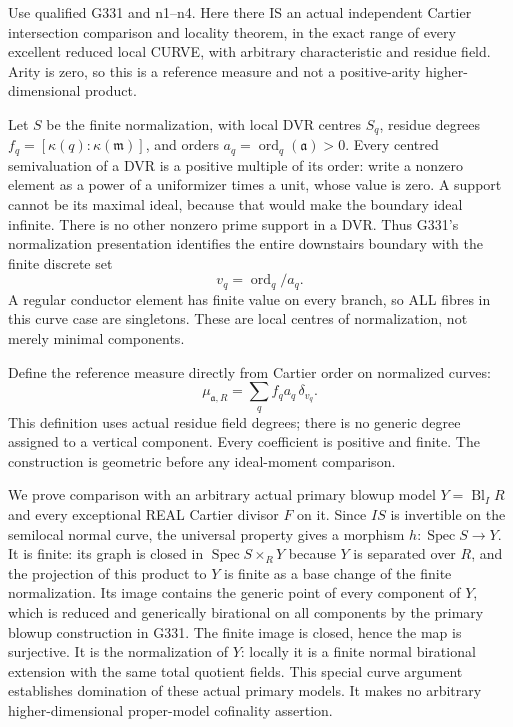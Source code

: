 \documentclass[
  11pt,
]{article}
\begin{document}
Use qualified G331 and n1--n4. Here there IS an actual independent
Cartier intersection comparison and locality theorem, in the exact range
of every excellent reduced local CURVE, with arbitrary characteristic
and residue field. Arity is zero, so this is a reference measure and not
a positive-arity higher-dimensional product.

Let \(S\) be the finite normalization, with local DVR centres \(S_q\),
residue degrees \(f_q=[\kappa(q):\kappa(\mathfrak m)]\), and orders
\(a_q=\operatorname{ord}_q(\mathfrak a)>0\). Every centred semivaluation
of a DVR is a positive multiple of its order: write a nonzero element as
a power of a uniformizer times a unit, whose value is zero. A support
cannot be its maximal ideal, because that would make the boundary ideal
infinite. There is no other nonzero prime support in a DVR. Thus G331's
normalization presentation identifies the entire downstairs boundary
with the finite discrete set \[v_q=\operatorname{ord}_q/a_q.\] A regular
conductor element has finite value on every branch, so ALL fibres in
this curve case are singletons. These are local centres of
normalization, not merely minimal components.

Define the reference measure directly from Cartier order on normalized
curves: \[\mu_{\mathfrak a,R}=\sum_q f_q a_q\,\delta_{v_q}.\tag{5}\]
This definition uses actual residue field degrees; there is no generic
degree assigned to a vertical component. Every coefficient is positive
and finite. The construction is geometric before any ideal-moment
comparison.

We prove comparison with an arbitrary actual primary blowup model
\(Y=\operatorname{Bl}_I R\) and every exceptional REAL Cartier divisor
\(F\) on it. Since \(I S\) is invertible on the semilocal normal curve,
the universal property gives a morphism \(h:\operatorname{Spec}S\to Y\).
It is finite: its graph is closed in \(\operatorname{Spec}S\times_R Y\)
because \(Y\) is separated over \(R\), and the projection of this
product to \(Y\) is finite as a base change of the finite normalization.
Its image contains the generic point of every component of \(Y\), which
is reduced and generically birational on all components by the primary
blowup construction in G331. The finite image is closed, hence the map
is surjective. It is the normalization of \(Y\): locally it is a finite
normal birational extension with the same total quotient fields. This
special curve argument establishes domination of these actual primary
models. It makes no arbitrary higher-dimensional proper-model cofinality
assertion.
\end{document}
